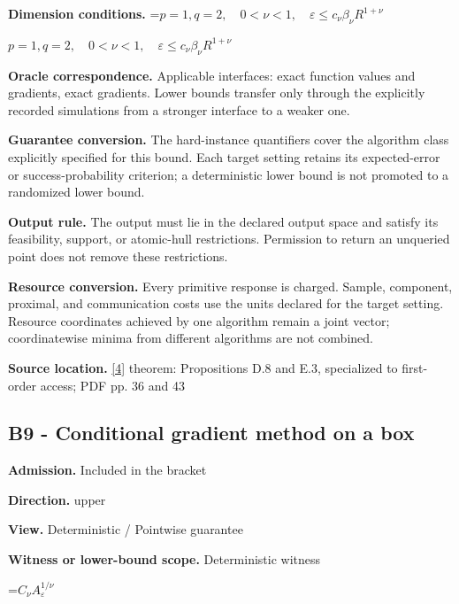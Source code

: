 \documentclass[10pt,a4paper]{article}
\newcommand{\AtlasMath}[1]{\par\begingroup\centering\setbox0=\hbox{$\displaystyle #1$}\ifdim\wd0>1.4\linewidth\typeout{ATLAS WIDE FORMULA: \the\wd0}\fi\ifdim\wd0>\linewidth\resizebox{\linewidth}{!}{\box0}\else\box0\fi\par\endgroup}
\newcommand{\AtlasInlineMath}[1]{\begingroup\setbox0=\hbox{$#1$}\ifdim\wd0>.4\linewidth\endgroup\AtlasMath{#1}\else\endgroup$#1$\fi}
\begin{document}
\textbf{Dimension conditions.} \AtlasInlineMath{p=1,q=2,\quad0<\nu<1,\quad\varepsilon\le c_\nu\beta_\nu R^{1+\nu}}



\textbf{Oracle correspondence.} Applicable interfaces: exact function values and gradients, exact gradients. Lower bounds transfer only through the explicitly recorded simulations from a stronger interface to a weaker one.



\textbf{Guarantee conversion.} The hard-instance quantifiers cover the algorithm class explicitly specified for this bound. Each target setting retains its expected-error or success-probability criterion; a deterministic lower bound is not promoted to a randomized lower bound.



\textbf{Output rule.} The output must lie in the declared output space and satisfy its feasibility, support, or atomic-hull restrictions. Permission to return an unqueried point does not remove these restrictions.



\textbf{Resource conversion.} Every primitive response is charged. Sample, component, proximal, and communication costs use the units declared for the target setting. Resource coordinates achieved by one algorithm remain a joint vector; coordinatewise minima from different algorithms are not combined.



\textbf{Source location.} \href{https://arxiv.org/pdf/2609.32910}{[4]} theorem: Propositions D.8 and E.3, specialized to first-order access; PDF pp. 36 and 43



\subsection{B9 - Conditional gradient method on a box}


\textbf{Admission.} Included in the bracket



\textbf{Direction.} upper



\textbf{View.} Deterministic / Pointwise guarantee



\textbf{Witness or lower-bound scope.} Deterministic witness



\AtlasMath{C_\nu A_\varepsilon^{1/\nu}}
\end{document}
